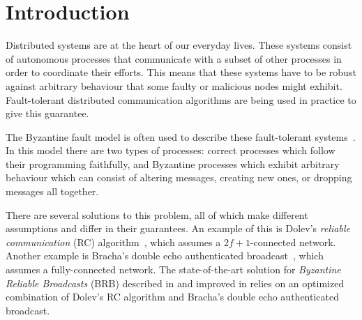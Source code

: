 \section{Introduction}








Distributed systems are at the heart of our everyday lives. These systems consist of autonomous processes that communicate with a subset of other processes in order to coordinate their efforts. This means that these systems have to be robust against arbitrary behaviour that some faulty or malicious nodes might exhibit. Fault-tolerant distributed communication algorithms are being used in practice to give this guarantee. 

The Byzantine fault model is often used to describe these fault-tolerant systems~\citationneeded. In this model there are two types of processes: correct processes which follow their programming faithfully, and Byzantine processes which exhibit arbitrary behaviour which can consist of altering messages, creating new ones, or dropping messages all together.

There are several solutions to this problem, all of which make different assumptions and differ in their guarantees. An example of this is Dolev's \textit{reliable communication} (RC) algorithm~\cite{dolev}, which assumes a $2f+1$-connected network. Another example is Bracha's double echo authenticated broadcast~\cite{bracha}, which assumes a fully-connected network. The state-of-the-art solution for \textit{Byzantine Reliable Broadcasts} (BRB) described in \cite{bracha-dolev} and improved in \cite{bonomi2021practical} relies on an optimized combination of Dolev's RC algorithm \cite{bonomi2019multihop} and Bracha's double echo authenticated broadcast.

